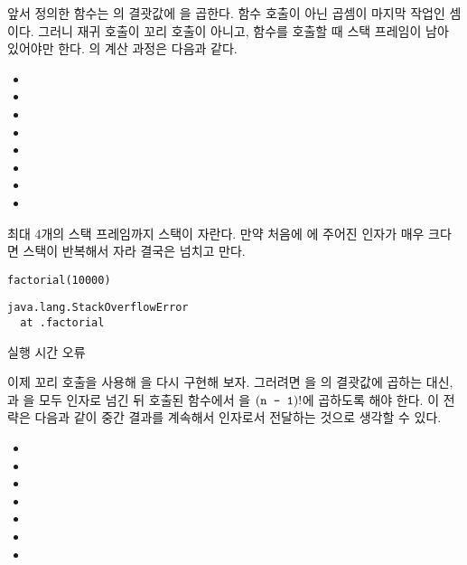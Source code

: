 앞서 정의한  함수는 의 결괏값에 을 곱한다. 함수 호출이
아닌 곱셈이 마지막 작업인 셈이다. 그러니 재귀 호출이 꼬리 호출이 아니고, 함수를
호출할 때 스택 프레임이 남아 있어야만 한다. 의 계산 과정은 다음과
같다.

\begin{itemize}
\item {}
\item {}
\item {}
\item {}
\item {}
\item {}
\item {}
\item {}
\end{itemize}

최대 4개의 스택 프레임까지 스택이 자란다. 만약 처음에 에 주어진 인자가
매우 크다면 스택이 반복해서 자라 결국은 넘치고 만다.

\begin{verbatim}
factorial(10000)
\end{verbatim}
\vspace{-1em}
\begin{mdframed}[hidealllines=true,backgroundcolor=gray!10,innerleftmargin=3pt,innerrightmargin=3pt,leftmargin=-3pt,rightmargin=-3pt]
\begin{verbatim}
java.lang.StackOverflowError
  at .factorial
\end{verbatim}
\vspace{-2em}
\begin{flushright}
\scriptsize\textsf{실행 시간 오류}
\end{flushright}
\end{mdframed}

이제 꼬리 호출을 사용해 을 다시 구현해 보자. 그러려면 을
의 결괏값에 곱하는 대신, 과 을 모두
인자로 넘긴 뒤 호출된 함수에서 을 $(\texttt{n - 1})!$에
곱하도록 해야 한다. 이 전략은 다음과 같이 중간 결과를 계속해서
인자로서 전달하는 것으로 생각할 수 있다.

\begin{itemize}
\item {}
\item {}
\item {}
\item {}
\item {}
\item {}
\item {}
\end{itemize}

